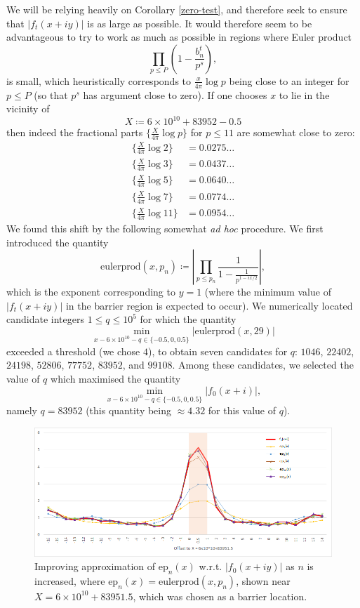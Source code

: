 We will be relying heavily on Corollary \ref{zero-test}, and therefore seek to ensure that $|f_t(x+iy)|$ is as large as possible.
It would therefore seem to be advantageous to try to work as much as possible in regions where Euler product
$$ \prod_{p \leq P} \left(1 - \frac{b_n^t}{p^s}\right),$$
is small, which heuristically corresponds to $\frac{x}{4\pi} \log p$ being close to an integer for $p \leq P$ (so that $p^s$ has argument close to zero).  If one chooses $x$ to lie in the vicinity of
$$ X \coloneqq 6 \times 10^{10} + 83952 - 0.5$$
then indeed the fractional parts $\{ \frac{X}{4\pi} \log p\}$ for $p \leq 11$ are somewhat close to zero:
\begin{align*}
\{ \frac{X}{4\pi} \log 2 \} &= 0.0275\dots \\
\{ \frac{X}{4\pi} \log 3 \} &= 0.0437\dots \\
\{ \frac{X}{4\pi} \log 5 \} &= 0.0640\dots \\
\{ \frac{X}{4\pi} \log 7 \} &= 0.0774\dots\\
\{ \frac{X}{4\pi} \log 11 \} &= 0.0954\dots
\end{align*}
We found this shift by the following somewhat \emph{ad hoc} procedure.  We first introduced the quantity
$$ \mathrm{eulerprod}(x,p_n) \coloneqq \left|\prod\limits_{p \leq p_n}\frac{1}{1-\frac{1}{p^{1-ix/2}}}\right|,$$
which is the  exponent corresponding to $y=1$ (where the minimum value of $|f_t(x+iy)|$ in the barrier region is expected to occur).  We numerically located candidate integers $1 \leq q \leq 10^5$ for which the quantity
$$ \min_{x - 6 \times 10^{10} - q \in \{-0.5,0,0.5\}} |\mathrm{eulerprod}(x,29)|$$
exceeded a threshold (we chose $4$), to obtain seven candidates for $q$: $1046$, $22402$, $24198$, $52806$, $77752$, $83952$, and $99108$.  Among these candidates, we selected the value of $q$ which maximised the quantity
$$ \min_{x - 6 \times 10^{10} - q \in \{-0.5,0,0.5\}} |f_0(x+i)|,$$
namely $q = 83952$ (this quantity being $\approx 4.32$ for this value of $q$).
\begin{figure}[h!]
  \includegraphics[width=\linewidth]{euler_product_approximation.png}
  \caption{Improving approximation of $\mathrm{ep}_n(x)$ w.r.t. $|f_0(x+iy)|$ as $n$ is increased, where $\mathrm{ep}_n(x)=\mathrm{eulerprod}(x,p_n)$, shown near $X=6 \times 10^{10} + 83951.5$, which was chosen as a barrier location.}
	\label{euler}
\end{figure}




